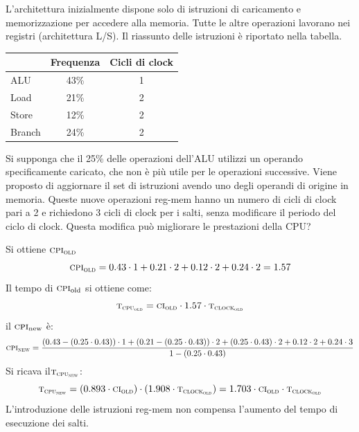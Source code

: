 \begin{exercise}
	L'architettura inizialmente dispone solo di istruzioni di caricamento e memorizzazione per accedere alla memoria. Tutte le altre operazioni lavorano nei registri (architettura L/S). Il riassunto delle istruzioni è riportato nella tabella.
	\begin{table}[ht]
		\centering
		\begin{tabular}{|l|c|c|}
			\hline
			& \textbf{Frequenza}&\textbf{Cicli di clock}
			\\\hline
			ALU & 43\% & 1
			\\\hline
			Load & 21\% & 2
			\\\hline
			Store & 12\% & 2
			\\\hline
			Branch & 24\% & 2
			\\\hline
		\end{tabular}
	\end{table}
	Si supponga che il 25\% delle operazioni dell'ALU utilizzi un operando specificamente caricato, che non è più utile per le operazioni successive. Viene proposto di aggiornare il set di istruzioni avendo uno degli operandi di origine in memoria. Queste nuove operazioni reg-mem hanno un numero di cicli di clock pari a 2 e richiedono 3 cicli di clock per i salti, senza modificare il periodo del ciclo di clock. Questa modifica può migliorare le prestazioni della CPU?
\end{exercise}
\begin{solution}
	Si ottiene $\textsc{cpi\textsubscript{old}}$
	\begin{equation*}
		\textsc{cpi\textsubscript{old}} = 0.43 \cdot 1 + 0.21 \cdot 2 + 0.12 \cdot 2 + 0.24 \cdot 2 = 1.57
	\end{equation*}
	Il tempo di $\textsc{cpi}\textsubscript{old}$ si ottiene come:
	\begin{equation*}
		\textsc{t\textsubscript{cpu\textsubscript{old}}} = \textsc{ci\textsubscript{old}} \cdot1.57 \cdot \textsc{t\textsubscript{clock\textsubscript{old}}}
	\end{equation*}
	il $\textsc{cpi}\textsubscript{new}$ è:
	\begin{equation*}
		\textsc{cpi\textsubscript{new}} = \frac{(0.43-(0.25 \cdot 0.43))\cdot 1+(0.21-(0.25\cdot 0.43))\cdot 2 +(0.25\cdot 0.43)\cdot 2+ 0.12 \cdot 2 + 0.24 \cdot 3}{1-(0.25 \cdot 0.43)}
	\end{equation*}
	Si ricava il$\textsc{t\textsubscript{cpu\textsubscript{new}}}$:
	\begin{equation*}
		\textsc{t\textsubscript{cpu\textsubscript{new}}}=(0.893\cdot \textsc{ci\textsubscript{old}})\cdot(1.908 \cdot \textsc{t\textsubscript{clock\textsubscript{old}}})=1.703 \cdot \textsc{ci\textsubscript{old}} \cdot \textsc{t\textsubscript{clock\textsubscript{old}}}
	\end{equation*}
	L'introduzione delle istruzioni reg-mem non compensa l'aumento del tempo di esecuzione dei salti.
\end{solution}
